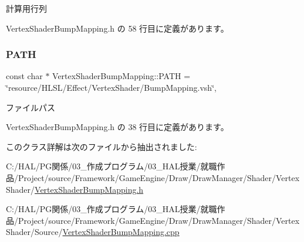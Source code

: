 計算用行列 



 Vertex\+Shader\+Bump\+Mapping.\+h の 58 行目に定義があります。

\mbox{\label{class_vertex_shader_bump_mapping_aa4b686f9aeb9e327ca79adf5974bc86d}} 
\subsubsection{\texorpdfstring{P\+A\+TH}{PATH}}
{\footnotesize\ttfamily const char $\ast$ Vertex\+Shader\+Bump\+Mapping\+::\+P\+A\+TH = \char`\"{}resource/H\+L\+SL/Effect/Vertex\+Shader/Bump\+Mapping.\+vsh\char`\"{}\hspace{0.3cm}{\ttfamily [static]}, {\ttfamily [private]}}



ファイルパス 



 Vertex\+Shader\+Bump\+Mapping.\+h の 38 行目に定義があります。



このクラス詳解は次のファイルから抽出されました\+:\begin{DoxyCompactItemize}
\item 
C\+:/\+H\+A\+L/\+P\+G関係/03\+\_\+作成プログラム/03\+\_\+\+H\+A\+L授業/就職作品/\+Project/source/\+Framework/\+Game\+Engine/\+Draw/\+Draw\+Manager/\+Shader/\+Vertex\+Shader/\mbox{\hyperlink{_vertex_shader_bump_mapping_8h}{Vertex\+Shader\+Bump\+Mapping.\+h}}\item 
C\+:/\+H\+A\+L/\+P\+G関係/03\+\_\+作成プログラム/03\+\_\+\+H\+A\+L授業/就職作品/\+Project/source/\+Framework/\+Game\+Engine/\+Draw/\+Draw\+Manager/\+Shader/\+Vertex\+Shader/\+Source/\mbox{\hyperlink{_vertex_shader_bump_mapping_8cpp}{Vertex\+Shader\+Bump\+Mapping.\+cpp}}\end{DoxyCompactItemize}
